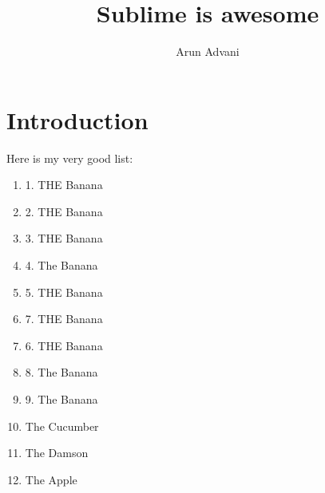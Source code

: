 \documentclass[12pt,a4paper]{article}
\title{Sublime is awesome}
\author{Arun Advani}
\begin{document}
\maketitle{}

\begin{abstract}
\end{abstract}


\section{Introduction}
\label{sect:Introduction}
Here is my very good list:

\begin{enumerate}
	\item 1. THE Banana
	\item 2. THE Banana
	\item 3. THE Banana
	\item 4. The Banana
	\item 5. THE Banana
	\item 7. THE Banana
	\item 6. THE Banana
	\item 8. The Banana
	\item 9. The Banana
	\item The Cucumber
	\item The Damson
	\item The Apple
\end{enumerate}



% 
% 
\end{document}
